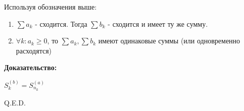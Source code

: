 
Используя обозначения выше:
\begin{enumerate}
    \item $\sum a_k$ - сходится. Тогда $\sum b_k$ - сходится  и имеет ту же сумму.
    \item $\forall k: a_k\geq 0$, то $\sum a_k, \sum b_k$ имеют одинаковые суммы (или одновременно расходятся)
\end{enumerate}

\textbf{Доказательство:}

$S_k^{(b)} = S^{(a)}_{n_k}$


\hfill Q.E.D.









